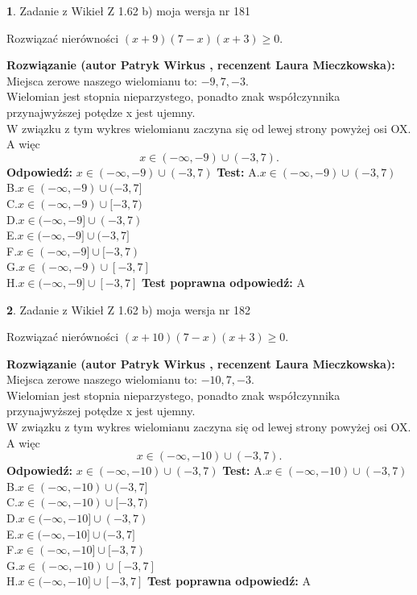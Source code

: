 \documentclass[12pt, a4paper]{article}
\theoremstyle{definition} %
\newtheorem{zad}{}
\newcommand{\zadStart}[1]{\begin{zad}#1\newline}
\newcommand{\zadStop}{\end{zad}}
\newcommand{\rozwStart}[2]{\noindent \textbf{Rozwiązanie (autor #1 , recenzent #2): }\newline}
\newcommand{\rozwStop}{\newline}
\newcommand{\odpStart}{\noindent \textbf{Odpowiedź:}\newline}
\newcommand{\odpStop}{\newline}
\newcommand{\testStart}{\noindent \textbf{Test:}\newline}
\newcommand{\testStop}{\newline}
\newcommand{\kluczStart}{\noindent \textbf{Test poprawna odpowiedź:}\newline}
\newcommand{\kluczStop}{\newline}
\begin{document}
\zadStart{Zadanie z Wikieł Z 1.62 b) moja wersja nr 181}

Rozwiązać nierówności $(x+9)(7-x)(x+3)\ge0$.
\zadStop
\rozwStart{Patryk Wirkus}{Laura Mieczkowska}
Miejsca zerowe naszego wielomianu to: $-9, 7, -3$.\\
Wielomian jest stopnia nieparzystego, ponadto znak współczynnika przy\linebreak najwyższej potędze x jest ujemny.\\ W związku z tym wykres wielomianu zaczyna się od lewej strony powyżej osi OX. A więc $$x \in (-\infty,-9) \cup (-3,7).$$
\rozwStop
\odpStart
$x \in (-\infty,-9) \cup (-3,7)$
\odpStop
\testStart
A.$x \in (-\infty,-9) \cup (-3,7)$\\
B.$x \in (-\infty,-9) \cup (-3,7]$\\
C.$x \in (-\infty,-9) \cup [-3,7)$\\
D.$x \in (-\infty,-9] \cup (-3,7)$\\
E.$x \in (-\infty,-9] \cup (-3,7]$\\
F.$x \in (-\infty,-9] \cup [-3,7)$\\
G.$x \in (-\infty,-9) \cup [-3,7]$\\
H.$x \in (-\infty,-9] \cup [-3,7]$
\testStop
\kluczStart
A
\kluczStop



\zadStart{Zadanie z Wikieł Z 1.62 b) moja wersja nr 182}

Rozwiązać nierówności $(x+10)(7-x)(x+3)\ge0$.
\zadStop
\rozwStart{Patryk Wirkus}{Laura Mieczkowska}
Miejsca zerowe naszego wielomianu to: $-10, 7, -3$.\\
Wielomian jest stopnia nieparzystego, ponadto znak współczynnika przy\linebreak najwyższej potędze x jest ujemny.\\ W związku z tym wykres wielomianu zaczyna się od lewej strony powyżej osi OX. A więc $$x \in (-\infty,-10) \cup (-3,7).$$
\rozwStop
\odpStart
$x \in (-\infty,-10) \cup (-3,7)$
\odpStop
\testStart
A.$x \in (-\infty,-10) \cup (-3,7)$\\
B.$x \in (-\infty,-10) \cup (-3,7]$\\
C.$x \in (-\infty,-10) \cup [-3,7)$\\
D.$x \in (-\infty,-10] \cup (-3,7)$\\
E.$x \in (-\infty,-10] \cup (-3,7]$\\
F.$x \in (-\infty,-10] \cup [-3,7)$\\
G.$x \in (-\infty,-10) \cup [-3,7]$\\
H.$x \in (-\infty,-10] \cup [-3,7]$
\testStop
\kluczStart
A
\kluczStop
\end{document}

